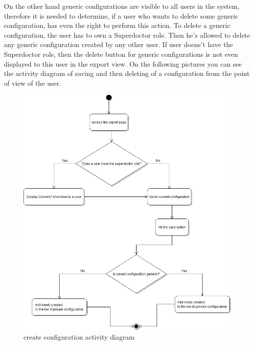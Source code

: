 \documentclass[thesis=B,english]{FITthesis}[2012/10/20]
\begin{document}
On the other hand generic configurations are visible to all users in the system, therefore it is needed to determine, if a user who wants to delete some generic configuration, has even the right to perform this action. To delete a generic configuration, the user has to own a Superdoctor role. Then he's allowed to delete any generic configuration created by any other user. If user doens't have the Superdoctor role, then the delete button for generic configurations is not even displayed to this user in the export view.
On the following pictures you can see the activity diagram of saving and then deleting of a configuration from the point of view of the user.
\begin{figure}\centering
\includegraphics[width=0.7\paperwidth]{createConfigurationDiagram}
		\caption{create configuration activity diagram}
\end{figure}
\end{document}
